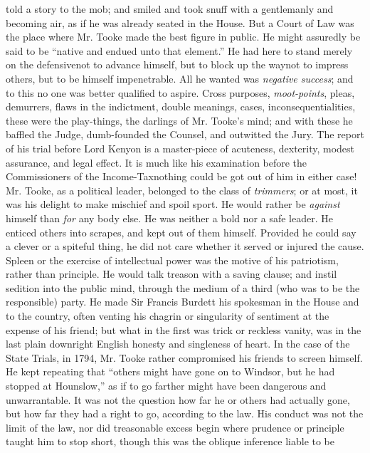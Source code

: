 told a story to the mob; and smiled and took snuff with a
gentlemanly and becoming air, as if he was already seated in the
House. But a Court of Law was the place where Mr. Tooke made the
best figure in public. He might assuredly be said to be ``native
and endued unto that element.'' He had here to stand merely on the
defensive\textemdash not to advance himself, but to block up the way\textemdash not to
impress others, but to be himself impenetrable. All he wanted was
\emph{negative success}; and to this no one was better qualified to
aspire. Cross purposes, \emph{moot-points}, pleas, demurrers, flaws in
the indictment, double meanings, cases, inconsequentialities,
these were the play-things, the darlings of Mr. Tooke's mind; and
with these he baffled the Judge, dumb-founded the Counsel, and
outwitted the Jury. The report of his trial before Lord Kenyon is
a master-piece of acuteness, dexterity, modest assurance, and
legal effect. It is much like his examination before the
Commissioners of the Income-Tax\textemdash nothing could be got out of him
in either case! Mr. Tooke, as a political leader, belonged to the
class of \emph{trimmers}; or at most, it was his delight to make
mischief and spoil sport. He would rather be \emph{against} himself
than \emph{for} any body else. He was neither a bold nor a safe
leader. He enticed others into scrapes, and kept out of them
himself. Provided he could say a clever or a spiteful thing, he
did not care whether it served or injured the cause. Spleen or the
exercise of intellectual power was the motive of his patriotism,
rather than principle. He would talk treason with a saving clause;
and instil sedition into the public mind, through the medium of a
third (who was to be the responsible) party. He made Sir Francis
Burdett his spokesman in the House and to the country, often
venting his chagrin or singularity of sentiment at the expense of
his friend; but what in the first was trick or reckless vanity,
was in the last plain downright English honesty and singleness of
heart. In the case of the State Trials, in 1794, Mr. Tooke rather
compromised his friends to screen himself. He kept repeating that
``others might have gone on to Windsor, but he had stopped at
Hounslow,'' as if to go farther might have been dangerous and
unwarrantable. It was not the question how far he or others had
actually gone, but how far they had a right to go, according to
the law. His conduct was not the limit of the law, nor did
treasonable excess begin where prudence or principle taught him to
stop short, though this was the oblique inference liable to be
